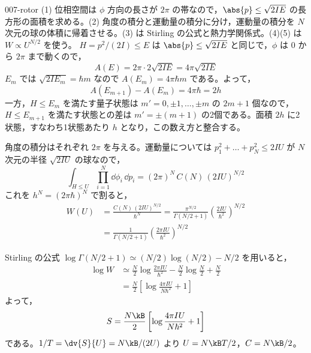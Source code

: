 \documentclass[uplatex,dvipdfmx,a4paper,11pt]{jsarticle}
\begin{document}
\begin{kaisetsu}{007-rotor}
\houshin (1) 位相空間は $\phi$ 方向の長さが $2\pi$ の帯なので，$\abs{p}\le\sqrt{2IE}$ の長方形の面積を求める。(2) 角度の積分と運動量の積分に分け，運動量の積分を $N$ 次元の球の体積に帰着させる。(3) は Stirling の公式と熱力学関係式。(4)(5) は $W\propto U^{N/2}$ を使う。
\keisan
{} $H=p^{2}/(2I)\le E$ は $\abs{p}\le\sqrt{2IE}$ と同じで，$\phi$ は $0$ から $2\pi$ まで動くので，
\[A(E)=2\pi\cdot2\sqrt{2IE}=4\pi\sqrt{2IE}\]
$E_{m}$ では $\sqrt{2IE_{m}}=\hbar m$ なので $A(E_{m})=4\pi\hbar m$ である。よって，
\[A(E_{m+1})-A(E_{m})=4\pi\hbar=2h\]
一方，$H\le E_{m}$ を満たす量子状態は $m'=0,\pm1,\dots,\pm m$ の $2m+1$ 個なので，$H\le E_{m+1}$ を満たす状態との差は $m'=\pm(m+1)$ の2個である。面積 $2h$ に2状態，すなわち1状態あたり $h$ となり，この数え方と整合する。

 角度の積分はそれぞれ $2\pi$ を与える。運動量については $p_{1}^{2}+\dots+p_{N}^{2}\le2IU$ が $N$ 次元の半径 $\sqrt{2IU}$ の球なので，
\[\int_{H\le U}\prod_{i=1}^{N}\dd\phi_{i}\,\dd p_{i}=(2\pi)^{N}\,C(N)\,(2IU)^{N/2}\]
これを $h^{N}=(2\pi\hbar)^{N}$ で割ると，
\begin{align*}
W(U)&=\frac{C(N)\,(2IU)^{N/2}}{\hbar^{N}}=\frac{\pi^{N/2}}{\Gamma(N/2+1)}\left(\frac{2IU}{\hbar^{2}}\right)^{N/2}\\
&=\frac{1}{\Gamma(N/2+1)}\left(\frac{2\pi IU}{\hbar^{2}}\right)^{N/2}
\end{align*}

 Stirling の公式 $\log\Gamma(N/2+1)\simeq(N/2)\log(N/2)-N/2$ を用いると，
\begin{align*}
\log W&\simeq\frac{N}{2}\log\frac{2\pi IU}{\hbar^{2}}-\frac{N}{2}\log\frac{N}{2}+\frac{N}{2}\\
&=\frac{N}{2}\left[\log\frac{4\pi IU}{N\hbar^{2}}+1\right]
\end{align*}
よって，
\[S=\frac{N\kB}{2}\left[\log\frac{4\pi IU}{N\hbar^{2}}+1\right]\]
である。$1/T=\dv{S}{U}=N\kB/(2U)$ より $U=N\kB T/2$，$C=N\kB/2$。


\end{kaisetsu}
\end{document}
